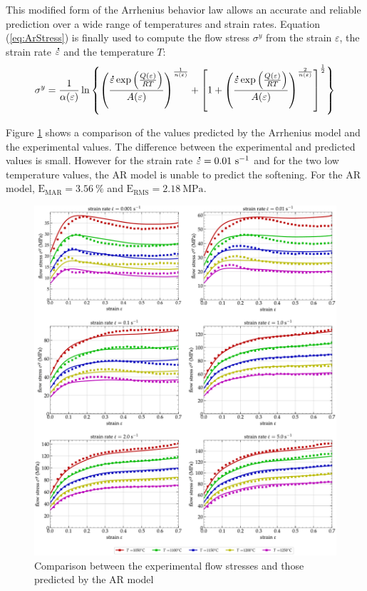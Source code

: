 \documentclass[twoside,english,1p,final,sort&compress]{elsarticle}
\theoremstyle{plain}
\DeclareRobustCommand{\mdot}[1]{\accentset{\mbox{\bfseries .}}{#1}}
\DeclareRobustCommand{\RMSE}{\text{E}_\text{RMS}}
\DeclareRobustCommand{\MARE}{\text{E}_\text{MAR}}
\DeclareRobustCommand{\ps}{\text{s}^{-1}}
\DeclareRobustCommand{\MPa}{\text{MPa}}
\begin{document}
This modified form of the Arrhenius behavior law allows an accurate and reliable prediction over a wide range of temperatures and strain rates.
Equation (\ref{eq:ArStress}) is finally used to compute the flow stress $\sigma^y$ from the strain $\varepsilon$, the strain rate $\mdot\varepsilon$ and the temperature $T$:
\begin{equation}
\sigma^y = \frac{1}{\alpha(\varepsilon)} \ln\left\{\left(\frac{\mdot\varepsilon \exp{\left(\frac{Q(\varepsilon)}{RT}\right)}}{A(\varepsilon)}\right)^{\frac{1}{n(\varepsilon)}} + \left[1 + \left(\frac{\mdot\varepsilon \exp{\left(\frac{Q(\varepsilon)}{RT}\right)}}{A(\varepsilon)}\right)^{\frac{2}{n(\varepsilon)}}\right]^{\frac{1}{2}}\right\}
\label{eq:ArStress}
\end{equation}

Figure \ref{fig:CompExp-AR-6} shows a comparison of the values predicted by the Arrhenius model and the experimental values.
The difference between the experimental and predicted values is small.
However for the strain rate $\mdot\varepsilon = 0.01~\ps$ and for the two low temperature values, the AR model is unable to predict the softening.
For the AR model, $\MARE=3.56~\%$ and $\RMSE=2.18~\MPa$.
\begin{figure}[!ht]
\centering
\includegraphics[width=\columnwidth]
{Figures/CompExp-AR-6}
\caption{Comparison between the experimental flow stresses and those predicted by the AR model}
\label{fig:CompExp-AR-6}
\end{figure}
\end{document}
